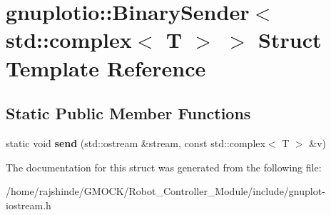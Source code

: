 \hypertarget{structgnuplotio_1_1_binary_sender_3_01std_1_1complex_3_01_t_01_4_01_4}{}\section{gnuplotio\+:\+:Binary\+Sender$<$ std\+:\+:complex$<$ T $>$ $>$ Struct Template Reference}
\label{structgnuplotio_1_1_binary_sender_3_01std_1_1complex_3_01_t_01_4_01_4}
\subsection*{Static Public Member Functions}
\begin{DoxyCompactItemize}
\item 
static void {\bfseries send} (std\+::ostream \&stream, const std\+::complex$<$ T $>$ \&v)\hypertarget{structgnuplotio_1_1_binary_sender_3_01std_1_1complex_3_01_t_01_4_01_4_a759de700a1cd68000830a4b15a6fec49}{}\label{structgnuplotio_1_1_binary_sender_3_01std_1_1complex_3_01_t_01_4_01_4_a759de700a1cd68000830a4b15a6fec49}

\end{DoxyCompactItemize}


The documentation for this struct was generated from the following file\+:\begin{DoxyCompactItemize}
\item 
/home/rajshinde/\+G\+M\+O\+C\+K/\+Robot\+\_\+\+Controller\+\_\+\+Module/include/gnuplot-\/iostream.\+h\end{DoxyCompactItemize}
